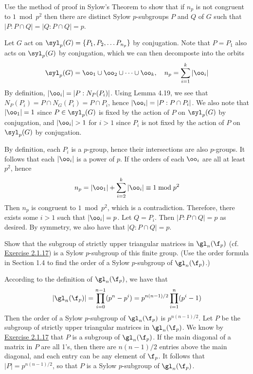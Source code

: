 \begin{exercise}\label{ex4.5.38}
	Use the method of proof in Sylow's Theorem to show that if $n_p$ is not congruent to $1 \bmod p^2$ then there are distinct Sylow $p$-subgroups $P$ and $Q$ of $G$ such that $|P : P \cap Q| = |Q : P \cap Q| = p$.
\end{exercise}

\begin{sol}
	Let $G$ act on $\syl_p(G) = \{P_1, P_2, \ldots P_{n_p}\}$ by conjugation. Note that $P = P_1$ also acts on $\syl_p(G)$ by conjugation, which we can then decomposte into the orbits
	\[\syl_p(G) = \oo_1 \cup \oo_2 \cup \cdots \cup \oo_k, \quad n_p = \sum_{i = 1}^k |\oo_i|\]
	By definition, $|\oo_i| = |P : N_P(P_i)|$. Using Lemma 4.19, we see that $N_P(P_i) = P \cap N_G(P_i) = P \cap P_i$, hence $|\oo_i| = |P : P \cap P_i|$. We also note that $|\oo_1| = 1$ since $P \in \syl_p(G)$ is fixed by the action of $P$ on $\syl_p(G)$ by conjugation, and $|\oo_i| > 1$ for $i > 1$ since $P_i$ is not fixed by the action of $P$ on $\syl_p(G)$ by conjugation.

	By definition, each $P_i$ is a $p$-group, hence their intersections are also $p$-groups. It follows that each $|\oo_i|$ is a power of $p$. If the orders of each $\oo_i$ are all at least $p^2$, hence
	\[n_p = |\oo_1| + \sum_{i = 2}^k |\oo_i| \equiv 1 \bmod p^2\]
	Then $n_p$ is congruent to $1 \bmod p^2$, which is a contradiction. Therefore, there exists some $i > 1$ such that $|\oo_i| = p$. Let $Q = P_i$. Then $|P : P \cap Q| = p$ as desired. By symmetry, we also have that $|Q : P \cap Q| = p$.
\end{sol}

\begin{exercise}\label{ex4.5.39}
	Show that the subgroup of strictly upper triangular matrices in $\gl_n(\f_p)$ (cf. \hyperref[ex2.1.17]{Exercise 2.1.17}) is a Sylow $p$-subgroup of this finite group. (Use the order formula in Section 1.4 to find the order of a Sylow $p$-subgroup of $\gl_n(\f_p)$.)
\end{exercise}

\begin{sol}
	According to the definition of $\gl_n(\f_p)$, we have that
	\[|\gl_n(\f_p)| = \prod_{i = 0}^{n-1} (p^n - p^i) = p^{n(n - 1)/2} \prod_{i = 1}^n (p^i - 1)\]
	Then the order of a Sylow $p$-subgroup of $\gl_n(\f_p)$ is $p^{n(n - 1)/2}$. Let $P$ be the subgroup of strictly upper triangular matrices in $\gl_n(\f_p)$. We know by \hyperref[ex2.1.17]{Exercise 2.1.17} that $P$ is a subgroup of $\gl_n(\f_p)$. If the main diagonal of a matrix in $P$ are all 1's, then there are $n(n - 1)/2$ entries above the main diagonal, and each entry can be any element of $\f_p$. It follows that $|P| = p^{n(n - 1)/2}$, so that $P$ is a Sylow $p$-subgroup of $\gl_n(\f_p)$.
\end{sol}

